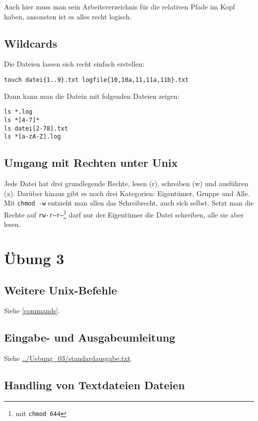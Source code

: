 \documentclass[10pt]{article}
\begin{document}
Auch hier muss man sein Arbeitsverzeichnis für die relativen Pfade im Kopf haben, ansonsten ist es alles recht logisch.

\subsection{Wildcards}

Die Dateien lassen sich recht einfach erstellen:
\begin{verbatim}
touch datei{1..9}.txt logfile{10,10a,11,11a,11b}.txt
\end{verbatim}

Dann kann man die Datein mit folgenden Dateien zeigen:
\begin{verbatim}
ls *.log
ls *[4-7]*
ls datei[2-78].txt
ls *[a-zA-Z].log
\end{verbatim}

\subsection{Umgang mit Rechten unter Unix}

Jede Datei hat drei grundlegende Rechte, lesen (r), schreiben (w) und ausführen (x). Darüber hinaus gibt es noch drei Kategorien: Eigentümer, Gruppe und Alle. Mit \texttt{chmod -w} entzieht man allen das Schreibrecht, auch sich selbst. Setzt man die Rechte auf \texttt{rw-r--r--}\footnote{mit \texttt{chmod 644}} darf nur der Eigentümer die Datei schreiben, alle sie aber lesen.

\section{Übung 3}

\subsection{Weitere Unix-Befehle}

Siehe \ref{commands}.

\subsection{Eingabe- und Ausgabeumleitung}

Siehe \url{../Uebung_03/standardausgabe.txt}.

\subsection{Handling von Textdateien Dateien}
\end{document}
